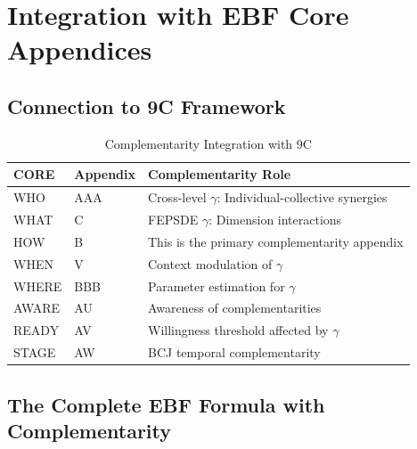 \section{Integration with EBF Core Appendices}
\label{sec:integration}

\subsection{Connection to 9C Framework}

\begin{table}[h]
\centering
\caption{Complementarity Integration with 9C}
\label{tab:8c-integration}
\renewcommand{\arraystretch}{1.3}
\small
\begin{tabular}{@{}llp{6cm}@{}}
\toprule
\textbf{CORE} & \textbf{Appendix} & \textbf{Complementarity Role} \\
\midrule
WHO & AAA & Cross-level $\gamma$: Individual-collective synergies \\
WHAT & C & FEPSDE $\gamma$: Dimension interactions \\
HOW & B & This is the primary complementarity appendix \\
WHEN & V & Context modulation of $\gamma$ \\
WHERE & BBB & Parameter estimation for $\gamma$ \\
AWARE & AU & Awareness of complementarities \\
READY & AV & Willingness threshold affected by $\gamma$ \\
STAGE & AW & BCJ temporal complementarity \\
\bottomrule
\end{tabular}
\end{table}

\subsection{The Complete EBF Formula with Complementarity}

